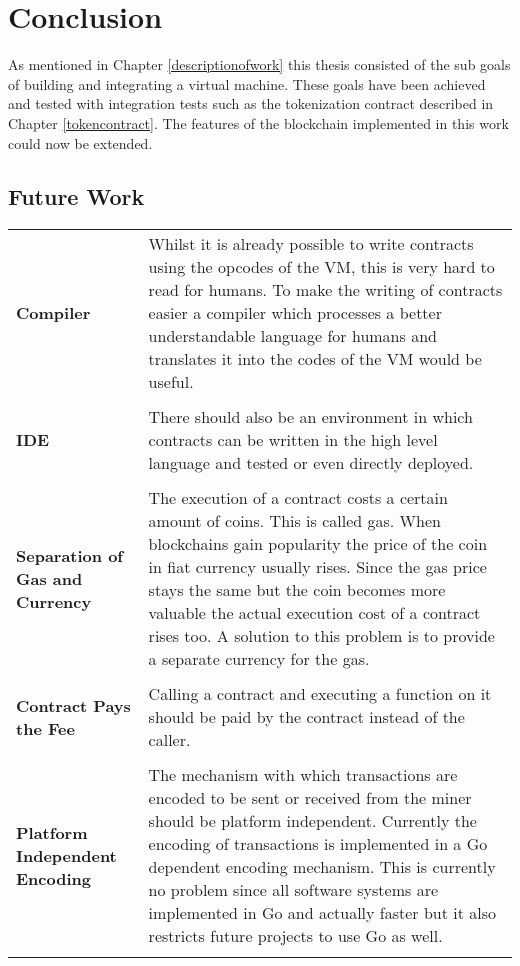 \chapter{Conclusion}
\label{futureworkandconclusions}
As mentioned in Chapter \ref{descriptionofwork} this thesis consisted of the sub goals of building and integrating a virtual machine. These goals have been achieved and tested with integration tests such as the tokenization contract described in Chapter \ref{tokencontract}. The features of the blockchain implemented in this work could now be extended.

\section{Future Work}
\begin{tabular}[t]{ p{3cm} p{12.5cm}}
\raggedright
\textbf{Compiler} & 
Whilst it is already possible to write contracts using the opcodes of the VM, this is very hard to read for humans. To make the writing of contracts easier a compiler which processes a better understandable language for humans and translates it into the codes of the VM would be useful. \\ \\

\textbf{IDE} & 
There should also be an environment in which contracts can be written in the high level language and tested or even directly deployed. \\ \\

\raggedright
\textbf{Separation of Gas and Currency} & 
The execution of a contract costs a certain amount of coins. This is called gas. When blockchains gain popularity the price of the coin in fiat currency usually rises. Since the gas price stays the same but the coin becomes more valuable the actual execution cost of a contract rises too. A solution to this problem is to provide a separate currency for the gas. \\ \\

\raggedright
\textbf{Contract Pays the Fee} & 
Calling a contract and executing a function on it should be paid by the contract instead of the caller. \\ \\

\raggedright
\textbf{Platform Independent Encoding} &
The mechanism with which transactions are encoded to be sent or received from the miner should be platform independent. Currently the encoding of transactions is implemented in a Go dependent encoding mechanism. This is currently no problem since all software systems are implemented in Go and actually faster but it also restricts future projects to use Go as well. \\ \\ 
\end{tabular}
